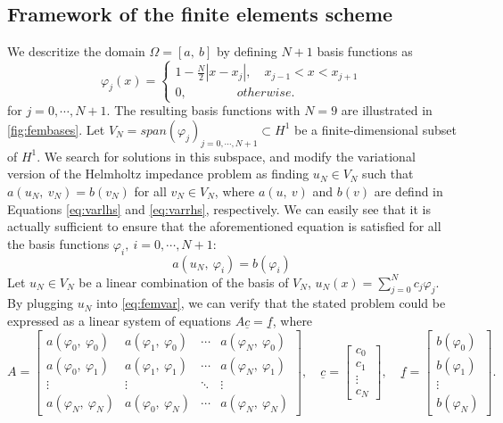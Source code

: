 \subsection{Framework of the finite elements scheme}\label{sec:femframework}
We descritize the domain $\Omega=[a,\:b]$ by defining $N+1$ basis functions as
\begin{equation}
    \label{eq:fembasisfuncs}
    \varphi_j(x) = \left\{\begin{matrix}
        1 - \frac{N}{2}|x - x_j|, \quad x_{j-1} < x < x_{j+1}
        \\
        0, \qquad \qquad otherwise.
        \end{matrix}\right.
\end{equation}
for $j = 0, \cdots, N+1$. The resulting basis functions with $N=9$ are illustrated in \autoref{fig:fembases}. Let $V_N = span(\varphi_j)_{j=0, \cdots, N+1} \subset H^{1}$ be a finite-dimensional subset of $H^{1}$. We search for solutions in this subspace, and modify the variational version of the Helmholtz impedance problem as finding $u_N \in V_N$ such that $a(u_N,\:v_N) = b(v_N)$ for all $v_N \in V_N$, where $a(u,\:v)$ and $b(v)$ are defind in Equations \ref{eq:varlhs} and \ref{eq:varrhs}, respectively. We can easily see that it is actually sufficient to ensure that the aforementioned equation is satisfied for all the basis functions $\varphi_i,\:i=0, \cdots, N+1$:
\begin{equation}
    \label{eq:femvar}
    a(u_N,\:\varphi_i) = b(\varphi_i)
\end{equation}
Let $u_N \in V_N$ be a linear combination of the basis of $V_N$, $u_N(x) = \sum_{j=0}^{N}{c_j\varphi_j}$. By plugging $u_N$ into \autoref{eq:femvar}, we can verify that the stated problem could be expressed as a linear system of equations $A\underline{c}=\underline{f}$, where
\begin{equation}
    \label{eq:femcoeffs}
    A = \begin{bmatrix}
        a(\varphi_0,\:\varphi_0) & a(\varphi_1,\:\varphi_0) & \cdots & a(\varphi_N,\:\varphi_0) \\
        a(\varphi_0,\:\varphi_1) & a(\varphi_1,\:\varphi_1) & \cdots & a(\varphi_N,\:\varphi_1) \\
        \vdots & \vdots & \ddots & \vdots \\
        a(\varphi_N,\:\varphi_N) & a(\varphi_0,\:\varphi_N) & \cdots & a(\varphi_N,\:\varphi_N)
        \end{bmatrix},
        \quad
        \underline{c} = \begin{bmatrix}
        c_0\\
        c_1\\
        \vdots\\
        c_N
        \end{bmatrix},
        \quad
        \underline{f} = \begin{bmatrix}
        b(\varphi_0)\\
        b(\varphi_1)\\
        \vdots\\
        b(\varphi_N)
        \end{bmatrix}.
\end{equation}
